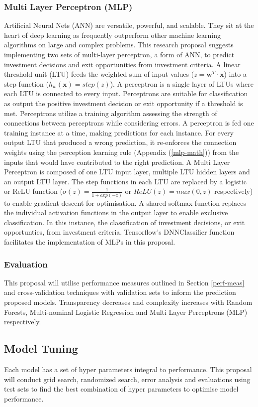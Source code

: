 \documentclass[12pt]{article}
\begin{document}
\subsubsection{Multi Layer Perceptron (MLP)}
Artificial Neural Nets (ANN) are versatile, powerful, and scalable.
They sit at the heart of deep learning as frequently outperform other machine learning algorithms on large and complex problems.
This research proposal suggests implementing two sets of multi-layer perceptron, a form of ANN, to predict investment decisions and exit opportunities from investment criteria.
A linear threshold unit (LTU) feeds the weighted sum of input values ($z=\textbf{w}^{T} \cdot \textbf{x}$) into a step function ($h_{w}(\textbf{x})=step(z)$).
A perceptron is a single layer of LTUs where each LTU is connected to every input.
Perceptrons are suitable for classification as output the positive investment decision or exit opportunity if a threshold is met.
Perceptrons utilize a training algorithm assessing the strength of connections between perceptrons while considering errors.
A perceptron is fed one training instance at a time, making predictions for each instance.
For every output LTU that produced a wrong prediction, it re-enforces the connection weights using the perception learning rule (Appendix (\ref{mlp-math})) from the inputs that would have contributed to the right prediction.
A Multi Layer Perceptron is composed of one LTU input layer, multiple LTU hidden layers and an output LTU layer.
The step functions in each LTU are replaced by a logistic or ReLU function ($\sigma(z)=\frac{1}{1+ exp(-z)}$ or $ReLU(z) = max(0,z)$ respectively) to enable gradient descent for optimisation.
A shared softmax function replaces the individual activation functions in the output layer to enable exclusive classification.
In this instance, the classification of investment decisions, or exit opportunties, from investment criteria.
Tensorflow's DNNClassifier function facilitates the implementation of MLPs in this proposal.
\subsubsection{Evaluation}
This proposal will utilise performance measures outlined in Section \ref{perf-meas} and cross-validation techniques with validation sets to inform the prediction proposed models.
Transparency decreases and complexity increases with Random Forests, Multi-nominal Logistic Regression and Multi Layer Perceptrons (MLP) respectively.
\subsection{Model Tuning}
Each model has a set of hyper parameters integral to performance. 
This proposal will conduct grid search, randomized search, error analysis and evaluations using test sets to find the best combination of hyper parameters to optimise model performance.
\end{document}
